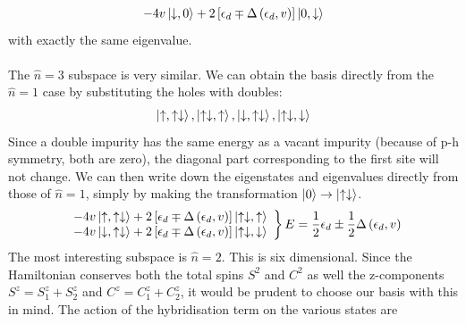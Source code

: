 \documentclass[twoside,11pt]{report}
\numberwithin{equation}{section}
\begin{document}
\begin{equation}\begin{aligned}
	-4v\ket{\downarrow,0} + 2 \left[ \epsilon_d \mp \Delta\left(\epsilon_d , v \right)\right] \ket{0, \downarrow}
\end{aligned}\end{equation}
with exactly the same eigenvalue.
\\\\The \(\hat n = 3\) subspace is very similar. We can obtain the basis directly from the \(\hat n = 1\) case by substituting the holes with doubles:
\begin{equation}\begin{aligned}
	\ket{\uparrow,\uparrow \downarrow}, \ket{\uparrow \downarrow,\uparrow}, \ket{\downarrow,\uparrow \downarrow}, \ket{\uparrow \downarrow,\downarrow}
\end{aligned}\end{equation}
Since a double impurity has the same energy as a vacant impurity (because of p-h symmetry, both are zero), the diagonal part corresponding to the first site will not change. We can then write down the eigenstates and eigenvalues directly from those of \(\hat n=1\), simply by making the transformation \(\ket{0} \to \ket{ \uparrow \downarrow}\).
\begin{align}
	\left.
	\begin{array}{l}
	-4v \ket{\uparrow,\uparrow \downarrow} +  2\left[ \epsilon_d \mp \Delta\left(\epsilon_d , v\right)  \right] \ket{\uparrow \downarrow, \uparrow}\\
	-4v \ket{\downarrow,\uparrow \downarrow} + 2 \left[ \epsilon_d \mp \Delta\left(\epsilon_d, v\right)  \right] \ket{\uparrow \downarrow, \downarrow}\end{array}
	\right\}
	E = \frac{1}{2} \epsilon_d \pm \frac{1}{2}\Delta\left(\epsilon_d , v \right)
\end{align}
The most interesting subspace is \(\hat n=2\). This is six dimensional. Since the Hamiltonian conserves both the total spins \(S^2\) and \(C^2\) as well the z-components \(S^z = S_1^z + S^z_2\) and \(C^z = C_1^z + C^z_2\), it would be prudent to choose our basis with this in mind. The action of the hybridisation term on the various states are
\end{document}

